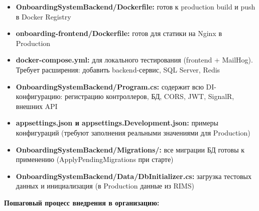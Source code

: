 \begin{itemize}
	\item \textbf{OnboardingSystemBackend/Dockerfile:} готов к production build и push в Docker Registry
	\item \textbf{onboarding-frontend/Dockerfile:} готов для статики на Nginx в Production
	\item \textbf{docker-compose.yml:} для локального тестирования (frontend + MailHog). Требует расширения: добавить backend-сервис, SQL Server, Redis
	\item \textbf{OnboardingSystemBackend/Program.cs:} содержит всю DI-конфигурацию: регистрацию контроллеров, БД, CORS, JWT, SignalR, внешних API
	\item \textbf{appsettings.json и appsettings.Development.json:} примеры конфигураций (требуют заполнения реальными значениями для Production)
	\item \textbf{OnboardingSystemBackend/Migrations/:} все миграции БД готовы к применению (ApplyPendingMigrations при старте)
	\item \textbf{OnboardingSystemBackend/Data/DbInitializer.cs:} загрузка тестовых данных и инициализация (в Production данные из RIMS)
\end{itemize}

\textbf{Пошаговый процесс внедрения в организацию:}

